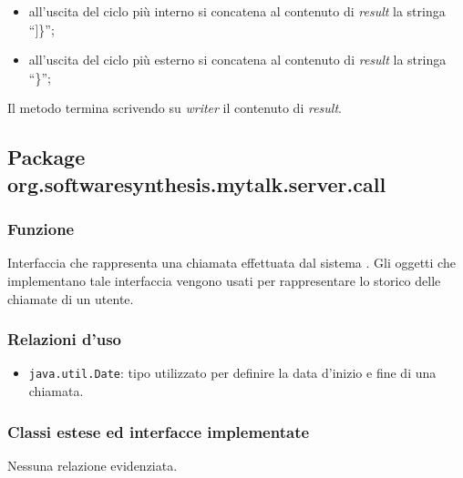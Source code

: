 \begin{description}
\begin{itemize}
\begin{itemize}
\begin{itemize}
				\item all'uscita del ciclo  più interno si concatena al contenuto di \textit{result} la stringa ``]\}'';
				\item all'uscita del ciclo  più esterno si concatena al contenuto di \textit{result} la stringa ``\}'';
			\end{itemize}
		\end{itemize}
	\end{itemize}
	Il metodo termina scrivendo su \textit{writer} il contenuto di \textit{result}.	
	
\end{description}

\subsection{Package org.softwaresynthesis.mytalk.server.call}\label{sec:call}


\subsubsection*{Funzione}
Interfaccia che rappresenta una chiamata effettuata dal sistema \caName. Gli oggetti che implementano tale interfaccia vengono usati per rappresentare lo storico delle chiamate di un utente.

\subsubsection*{Relazioni d'uso}
\begin{itemize}
	\item \texttt{java.util.Date}: tipo utilizzato per definire la data d'inizio e fine di una chiamata.
\end{itemize}

\subsubsection*{Classi estese ed interfacce implementate}

Nessuna relazione evidenziata.

